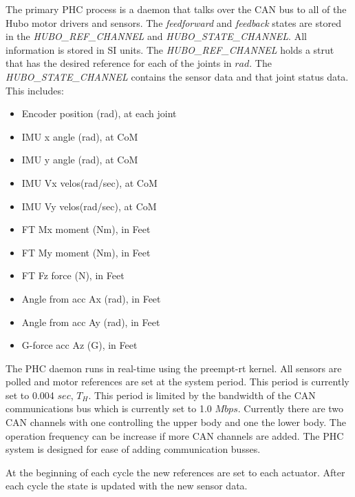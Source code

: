 The primary PHC process is a daemon that talks over the CAN bus to all of the Hubo motor drivers and sensors.  
The \textit{feedforward} and \textit{feedback} states are stored in the \textit{HUBO\_REF\_CHANNEL} and \textit{HUBO\_STATE\_CHANNEL}.  
All information is stored in SI units.  The \textit{HUBO\_REF\_CHANNEL} holds a strut that has the desired reference for each of the joints in $rad$.  
The \textit{HUBO\_STATE\_CHANNEL} contains the sensor data and that joint status data.  
This includes:

\begin{itemize}
                \item Encoder position (rad), at each joint
                \item IMU x angle (rad), at CoM
                \item IMU y angle (rad), at CoM
                \item IMU Vx velos(rad/sec), at CoM
                \item IMU Vy velos(rad/sec), at CoM
                \item FT Mx moment (Nm), in Feet
                \item FT My moment (Nm), in Feet
                \item FT Fz force (N), in Feet
                \item Angle from acc Ax (rad), in Feet
                \item Angle from acc Ay (rad), in Feet
                \item G-force acc Az (G), in Feet
\end{itemize}

The PHC daemon runs in real-time using the preempt-rt kernel.  
All sensors are polled and motor references are set at the system period.  
This period is currently set to 0.004 $sec$, $T_H$.  
This period is limited by the bandwidth of the CAN communications bus which is currently set to 1.0 $Mbps$.  
Currently there are two CAN channels with one controlling the upper body and one the lower body.  
The operation frequency can be increase if more CAN channels are added.  
The PHC system is designed for ease of adding communication busses.  

At the beginning of each cycle the new references are set to each actuator.  
After each cycle the state is updated with the new sensor data.

